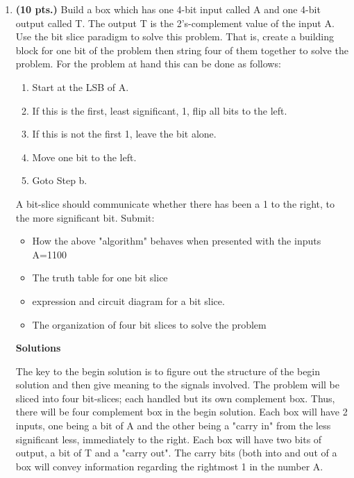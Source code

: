 \begin{enumerate}
        \item \textbf{ (10 pts.)} Build a box which has one 4-bit input called A and
            one 4-bit output called T. The output T is the 2's-complement value
            of the input A.  Use the bit slice paradigm to solve this
            problem.  That is, create a building block for one bit of the problem
            then string four of them together to solve the problem.
            For the problem at hand this can be done as follows:
            \begin{enumerate}
                \item Start at the LSB of A.
                \item If this is the first, least significant, 1, flip all bits
                    to the left.
                \item If this is not the first 1, leave the bit alone.
                \item Move one bit to the left.
                \item Goto Step b.
            \end{enumerate}
            A bit-slice should communicate whether there has been a 1 to the right,
            to the more significant bit.  Submit:
            \begin{itemize}
                \item How the above "algorithm" behaves when presented with
                    the inputs A=1100
                \item The truth table for one bit slice
                \item \SOPmin expression and circuit diagram for a bit slice.
                \item The organization of four bit slices to solve the problem
            \end{itemize}

            \begin{onlysolution} \textbf{Solutions} \itshape{
                    The key to the begin solution  is to figure out the structure
                    of the begin solution  and then give meaning to the signals involved.
                    The problem will be sliced into four bit-slices; each handled
                    but its own complement box.  Thus, there will be four complement
                    box in the begin solution.  Each box will have 2 inputs, one being
                    a bit of A and the other being a "carry in" from the less
                    significant less, immediately to the right.  Each box
                    will have two bits of output, a bit of T and a "carry out".
                    The carry bits (both into and out of a box will convey
                        information regarding the rightmost 1 in the number A.

}
\end{onlysolution}
\end{enumerate}
